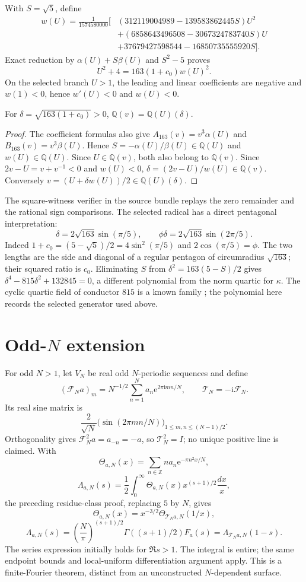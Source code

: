 \documentclass[11pt]{article}
\newcommand{\Q}{\mathbb Q}\newcommand{\R}{\mathbb R}\newcommand{\ii}{\mathrm i}\newcommand{\e}{\mathrm e}\newcommand{\Fcal}{\mathcal F}\newcommand{\Tcal}{\mathcal T}
\begin{document}
With $S=\sqrt5$, define
\begin{align*}
w(U)=\frac{1}{1574580000}[&(312119004989-139583862445S)U^2\\
&+(6858643496508-3067324783740S)U\\
&+37679427598544-16850735555920S].
\end{align*}
Exact reduction by $\alpha(U)+S\beta(U)$ and $S^2-5$ proves
\[
U^2+4=163(1+c_0)w(U)^2.
\]
On the selected branch $U>1$, the leading and linear coefficients are
negative and $w(1)<0$, hence $w'(U)<0$ and $w(U)<0$.
\begin{corollary}\label{equality}
For $\delta=\sqrt{163(1+c_0)}>0$, $\Q(v)=\Q(U)(\delta)$.
\end{corollary}
\begin{proof}
The coefficient formulas also give
$A_{163}(v)=v^3\alpha(U)$ and $B_{163}(v)=v^3\beta(U)$.
Hence $S=-\alpha(U)/\beta(U)\in\Q(U)$ and $w(U)\in\Q(U)$.
Since $U\in\Q(v)$, both also belong to $\Q(v)$.  Since
$2v-U=v+v^{-1}<0$ and $w(U)<0$,
$\delta=(2v-U)/w(U)\in\Q(v)$.  Conversely
$v=(U+\delta w(U))/2\in\Q(U)(\delta)$.
\end{proof}

The square-witness verifier in the source bundle replays the zero remainder
and the rational sign comparisons.
The selected radical has a direct pentagonal interpretation:
\[
\delta=2\sqrt{163}\sin(\pi/5),\qquad
\phi\delta=2\sqrt{163}\sin(2\pi/5).
\]
Indeed $1+c_0=(5-\sqrt5)/2=4\sin^2(\pi/5)$ and
$2\cos(\pi/5)=\phi$.  The two lengths are the side and diagonal
of a regular pentagon of circumradius $\sqrt{163}$; their squared ratio
is $c_0$.  Eliminating $S$ from $\delta^2=163(5-S)/2$ gives
$\delta^4-815\delta^2+132845=0$, a different polynomial from the
norm quartic for $\kappa$.  The cyclic quartic field of conductor $815$ is a
known family \cite{SpearmanWilliams}; the polynomial here records the selected
generator used above.

\section{Odd-\texorpdfstring{$N$}{N} extension}\label{oddN}
For odd $N>1$, let $V_N$ be real odd $N$-periodic sequences and define
\[
(\Fcal_Na)_m=N^{-1/2}\sum_{n=1}^Na_n\e^{2\pi\ii mn/N},\qquad
\Tcal_N=-\ii\Fcal_N.
\]
Its real sine matrix is
\[
\frac2{\sqrt N}\bigl(\sin(2\pi mn/N)\bigr)_{1\le m,n\le(N-1)/2}.
\]
Orthogonality gives $\Fcal_N^2a=a_{-n}=-a$, so $\Tcal_N^2=I$; no unique
positive line is claimed.  With
\[
\Theta_{a,N}(x)=\sum_{n\in\mathbb Z}na_n\e^{-\pi n^2x/N},
\]\[
\Lambda_{a,N}(s)=\frac{1}{2}\int_0^\infty\Theta_{a,N}(x)x^{(s+1)/2}\frac{dx}{x},
\]
the preceding residue-class proof, replacing $5$ by $N$, gives
\[
\Theta_{a,N}(x)=x^{-3/2}\Theta_{\Tcal_Na,N}(1/x),
\]\[
\Lambda_{a,N}(s)=\left(\frac{N}{\pi}\right)^{(s+1)/2}
\Gamma((s+1)/2)F_a(s)=\Lambda_{\Tcal_Na,N}(1-s).
\]
The series expression initially holds for $\Re s>1$. The integral is entire;
the same endpoint bounds and local-uniform differentiation argument apply.
This is a finite-Fourier theorem, distinct from an unconstructed
$N$-dependent surface.
\end{document}
